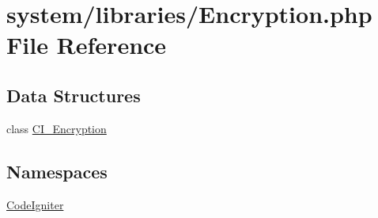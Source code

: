 \hypertarget{_encryption_8php}{}\section{system/libraries/\+Encryption.php File Reference}
\label{_encryption_8php}
\subsection*{Data Structures}
\begin{DoxyCompactItemize}
\item 
class \mbox{\hyperlink{class_c_i___encryption}{C\+I\+\_\+\+Encryption}}
\end{DoxyCompactItemize}
\subsection*{Namespaces}
\begin{DoxyCompactItemize}
\item 
 \mbox{\hyperlink{namespace_code_igniter}{Code\+Igniter}}
\end{DoxyCompactItemize}

